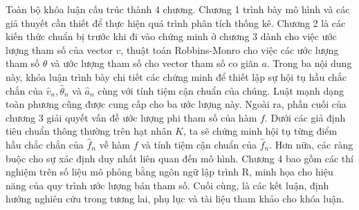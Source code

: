 Toàn bộ khóa luận cấu trúc thành 4 chương. Chương 1 trình bày mô hình và các giả thuyết cần thiết để thực hiện quá trình phân tích thống kê. Chương 2 là các kiến thức chuẩn bị trước khi đi vào chứng minh ở chương 3 dành cho việc ước lượng tham số của vector $v$, thuật toán Robbins-Monro cho việc các ước lượng tham số  $\theta$ và ước lượng tham số cho vector tham số co giãn $a$. Trong ba nội dung này, khóa luận trình bày chi tiết các chứng minh để thiết lập sự hội tụ hầu chắc chắn của $\widehat{v}_{n}, \widehat{\theta}_{n}$ và $\widehat{a}_{n}$ cùng với tính tiệm cận chuẩn của chúng. Luật mạnh dạng toàn phương cũng được cung cấp cho ba ước lượng này. Ngoài ra, phần cuối của chương 3 giải quyết vấn đề ước lượng phi tham số của hàm $f$. Dưới các giả định tiêu chuẩn thông thường trên hạt nhân $K$, ta sẽ chứng minh hội tụ từng điểm hầu chắc chắn của $\widehat{f}_{n}$ về hàm $f$ và tính tiệm cận chuẩn của $\widehat{f}_{n}$. Hơn nữa, các ràng buộc cho sự xác định duy nhất liên quan đến mô hình. Chương 4 bao gồm các thí nghiệm trên số liệu mô phỏng bằng ngôn ngữ lập trình R, minh họa cho hiệu năng của quy trình ước lượng bán tham số. Cuối cùng, là các kết luận, định hướng nghiên cứu trong tương lai, phụ lục và tài liệu tham khảo cho khóa luận.
